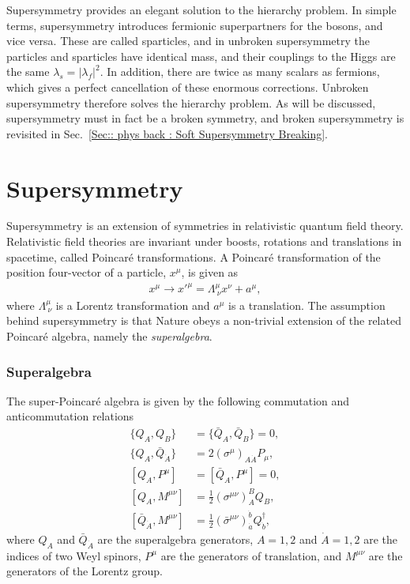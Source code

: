\documentclass[twoside,english]{uiofysmaster}
\begin{document}
Supersymmetry provides an elegant solution to the hierarchy problem. In simple terms, supersymmetry introduces fermionic superpartners for the bosons, and vice versa. These are called sparticles, and in unbroken supersymmetry the particles and sparticles have identical mass, and their couplings to the Higgs are the same $\lambda_s = |\lambda_f|^2$. In addition, there are twice as many scalars as fermions, which gives a perfect cancellation of these enormous corrections. Unbroken supersymmetry therefore solves the hierarchy problem. As will be discussed, supersymmetry must in fact be a broken symmetry, and broken supersymmetry is revisited in Sec.~\ref{Sec:: phys back : Soft Supersymmetry Breaking}.


\section{Supersymmetry}

Supersymmetry is an extension of symmetries in relativistic quantum field theory. Relativistic field theories are invariant under boosts, rotations and translations in spacetime, called Poincar\'{e} transformations. A Poincar\'{e} transformation of the position four-vector of a particle, $x^{\mu}$, is given as
\begin{align}
x^{\mu} \rightarrow x'^{\mu} = \Lambda^{\mu}_{\ \nu} x^{\nu} + a^{\mu}, 
\end{align}
where $\Lambda^{\mu}_{\ \nu}$ is a Lorentz transformation and $a^{\mu}$ is a translation. The assumption behind supersymmetry is that Nature obeys a non-trivial extension of the related Poincar\'{e} algebra, namely the \textit{superalgebra}. 

\subsubsection{Superalgebra}

The super-Poincar\'{e} algebra is given by the following commutation and anticommutation relations \cite{kvellestad2015chasing}
\begin{align}
\{Q_A, Q_B \} &= \{ \bar{Q}_A, \bar{Q}_B\} = 0,\\
\{Q_A, \bar{Q}_{\dot{A}} \} &= 2 (\sigma^{\mu})_{A \dot{A}} P_{\mu},\\
[Q_A, P^{\mu}] &= [\bar{Q}_A, P^{\mu}] = 0,\label{Eq:: [Q,P]}\\
[Q_A, M^{\mu \nu}] &= \frac{1}{2} (\sigma^{\mu \nu})_A^B Q_B,\\
[\bar{Q}_{\dot{A}}, M^{\mu \nu}] &= \frac{1}{2} (\bar{\sigma}^{\mu \nu})_{\dot{a}}^{\dot{b}} Q_{\dot{b}}^{\dagger},  
\end{align}
where $Q_A$ and $\bar{Q}_{\dot{A}}$ are the superalgebra generators, $A=1,2$ and $\dot{A}=1,2$ are the indices of two Weyl spinors, $P^{\mu}$ are the generators of translation, and $M^{\mu \nu}$ are the generators of the Lorentz group. 
\end{document}

